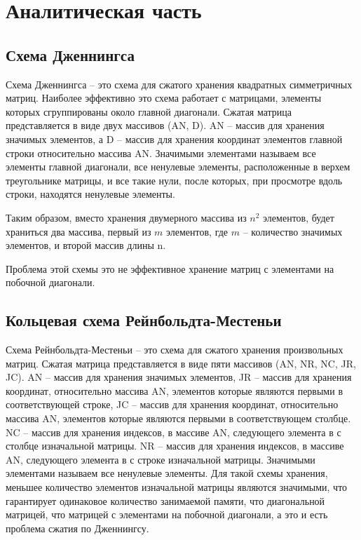 \chapter{Аналитическая часть}
\section{Схема Дженнингса}
Схема Дженнингса -- это схема для сжатого хранения квадратных симметричных матриц. Наиболее эффективно это схема работает с матрицами, элементы которых сгруппированы около главной диагонали. Сжатая матрица  представляется в виде двух массивов (AN, D). AN -- массив для хранения значимых элементов, а D -- массив для хранения координат элементов главной строки относительно массива AN. Значимыми элементами называем все элементы главной диагонали, все ненулевые элементы, расположенные в верхем треугольнике матрицы, и все такие нули, после которых, при просмотре вдоль строки, находятся ненулевые элементы.

Таким образом, вместо хранения двумерного массива из $n^{2}$ элементов, будет храниться два 
массива, первый из $m$ элементов, где $m$ -- количество значимых элементов, и второй массив длины n.

Проблема этой схемы это не эффективное хранение матриц с элементами на побочной диагонали.
\section{Кольцевая схема Рейнбольдта-Местеньи}
Схема Рейнбольдта-Местеньи -- это схема для сжатого хранения произвольных матриц. Сжатая матрица представляется в виде пяти массивов (AN, NR, NC, JR, JC). AN -- массив для хранения значимых элементов, JR -- массив для хранения координат, относительно массива AN, элементов которые являются первыми в соответствующей строке, JC -- массив для хранения координат, относительно массива AN, элементов которые являются первыми в соответствующем столбце. NC -- массив для хранения индексов, в массиве AN, следующего элемента в с столбце изначальной матрицы. NR -- массив для хранения индексов, в массиве AN, следующего элемента в с строке изначальной матрицы. Значимыми элементами называем все ненулевые элементы. Для такой схемы хранения, меньшее количество элементов изначальной матрицы являются значимыми, что гарантирует одинаковое количество занимаемой памяти, что диагональной матрицей, что матрицей с элементами на побочной диагонали, а это и есть проблема сжатия по Дженнингсу.
\clearpage
